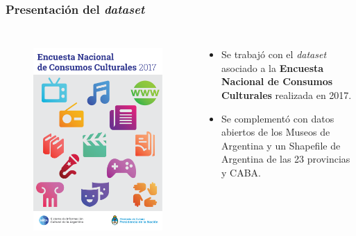 \documentclass[10pt]{beamer}
\begin{document}
\begin{frame}
\frametitle{Presentación del \textit{dataset}}

\begin{columns}
\begin{figure}
\centering
\includegraphics[height=0.7\textheight]{encc_informe_portada.pdf}
\label{fig:portada_encc}
\end{figure}

\begin{itemize}
\item Se trabajó con el \textit{dataset} asociado a la \textbf{Encuesta Nacional de Consumos Culturales} realizada en 2017. 
\item Se complementó con datos abiertos de los Museos de Argentina y un Shapefile de Argentina de las 23 provincias y CABA.
\end{itemize}
\end{columns}

\end{frame}
\end{document}
